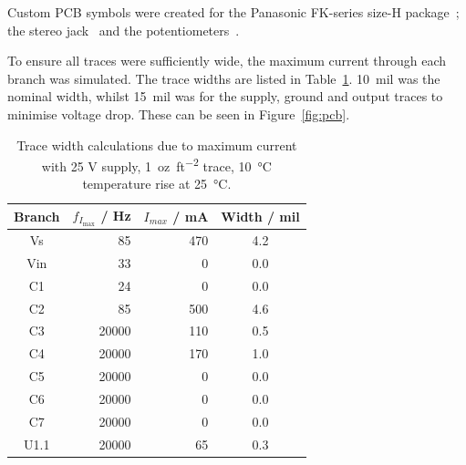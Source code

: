 \documentclass[a4paper,10pt]{article}
\newcommand{\DesignSparkPcb}{DesignSpark
	PCB\textsuperscript{\textregistered}\xspace}
\begin{document}
Custom PCB symbols were created for the Panasonic FK-series size-H
package~\cite{panasonicfk}; the stereo jack~\cite{switchcraft35rapc} and the 
potentiometers~\cite{bourns91_95}.


To ensure all traces were sufficiently wide, the maximum current through each
branch was simulated. The trace widths are listed in
Table~\ref{tab:width}. \SI{10}{mil} was the nominal width, whilst
\SI{15}{mil} was for the supply, ground and output traces to minimise voltage
drop. These can be seen in Figure~\ref{fig:pcb}.

\begin{table}[h]
	\centering
	\caption{Trace width calculations due to maximum current with 25 V
		     supply, \SI{1}{oz\per ft^2} trace, \SI{10}{\celsius} temperature
		     rise at \SI{25}{\celsius}.}
    \label{tab:width}
    \begin{footnotesize}
	\begin{tabular}{@{}crrc@{}}
	\toprule
	Branch &
	{$f_{I_{\text{max}}}$ / \si{\hertz}} &
	{$I_{max}$ / \si{\milli\ampere}} &
	Width / mil \\
	\midrule
	Vs   &    85 & 470 & 4.2 \\
	Vin  &    33 &   0 & 0.0 \\
	C1   &    24 &   0 & 0.0 \\
	C2   &    85 & 500 & 4.6 \\ 
	C3   & 20000 & 110 & 0.5 \\
	C4   & 20000 & 170 & 1.0 \\
	C5   & 20000 &   0 & 0.0 \\
	C6   & 20000 &   0 & 0.0 \\
	C7   & 20000 &   0 & 0.0 \\
	U1.1 & 20000 &  65 & 0.3 \\
	\bottomrule
	\end{tabular}
    \end{footnotesize}
\end{table}
\end{document}
